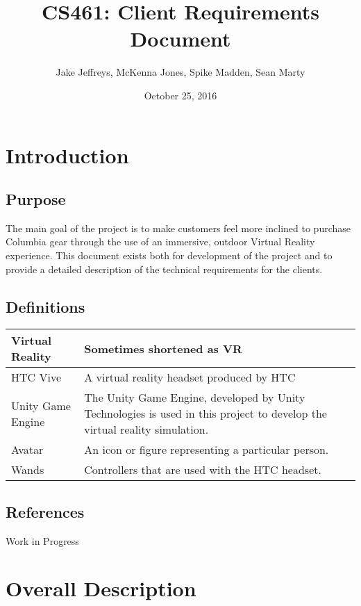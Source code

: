 \documentclass[10pt, oneside,onecolumn,draftclsnofoot]{IEEEtran}
\title{CS461: Client Requirements Document}
\author{Jake Jeffreys, McKenna Jones, Spike Madden, Sean Marty}
\date{October 25, 2016}
\begin{document}
\begin{titlepage}
\maketitle
\vspace{3cm}

\end{titlepage}

\section{Introduction}

\subsection{Purpose}
The main goal of the project is to make customers feel more inclined to purchase
Columbia gear through the use of an immersive, outdoor Virtual Reality
experience. This document exists both for development of the project and to provide a detailed description of the technical requirements for the clients.

\subsection{Definitions}
\begin{center}
	\begin{tabular}{| m{3cm} | m{9cm} |}
		\hline
		Virtual Reality & Sometimes shortened as VR \\
		\hline
		HTC Vive & A virtual reality headset produced by HTC \\
		\hline
		Unity Game Engine & The Unity Game Engine, developed by Unity Technologies
    is used in this project to develop the virtual reality simulation. \\
    \hline
    Avatar & An icon or figure representing a particular person. \\
    \hline
    Wands & Controllers that are used with the HTC headset. \\
    \hline
		\end{tabular}
\end{center}

\subsection{References}
Work in Progress

\section{Overall Description}
\end{document}
